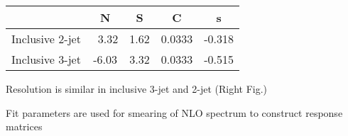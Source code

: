 \begin{frame}
\begin{center}
\begin{table}[htbp]
\begin{tabular}{ccccc}
                 &    N    &  S   &    C   &    s   \\ \hline
Inclusive 2-jet  & ~3.32 & 1.62 & 0.0333 & -0.318  \\
Inclusive 3-jet  & -6.03 & 3.32 & 0.0333 & -0.515  \\
\hline \hline
           
\end{tabular}
\end{table}
\vspace{2mm}
\begin{itemize}
 {\scriptsize \item Resolution is similar in inclusive 3-jet and 2-jet (Right Fig.)
\vspace{2mm}
 \item Fit parameters are used for smearing of NLO spectrum to construct response matrices \\ }
\end{itemize}
\end{center}
\end{frame}

